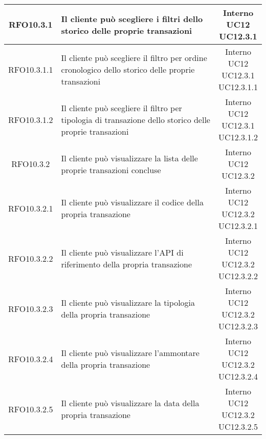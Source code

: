 \begin{longtable}{|c|p{8cm}|c|}
\hypertarget{RFO10.3.1}{RFO10.3.1} & Il cliente può scegliere i filtri dello storico delle proprie transazioni & \makecell*{Interno\\UC12\\UC12.3.1} \\
\hline

\hypertarget{RFO10.3.1.1}{RFO10.3.1.1} & Il cliente può scegliere il filtro per ordine cronologico dello storico delle proprie transazioni & \makecell*{Interno\\UC12\\UC12.3.1\\UC12.3.1.1} \\
\hline
\hypertarget{RFO10.3.1.2}{RFO10.3.1.2} & Il cliente può scegliere il filtro per tipologia di transazione dello storico delle proprie transazioni & \makecell*{Interno\\UC12\\UC12.3.1\\UC12.3.1.2} \\
\hline

\hypertarget{RFO10.3.2}{RFO10.3.2} & Il cliente può visualizzare la lista delle proprie transazioni concluse & \makecell*{Interno\\UC12\\UC12.3.2} \\
\hline

\hypertarget{RFO10.3.2.1}{RFO10.3.2.1} & Il cliente può visualizzare il codice della propria transazione & \makecell*{Interno\\UC12\\UC12.3.2\\UC12.3.2.1} \\
\hline
\hypertarget{RFO10.3.2.2}{RFO10.3.2.2} & Il cliente può visualizzare l'API di riferimento della propria transazione & \makecell*{Interno\\UC12\\UC12.3.2\\UC12.3.2.2} \\
\hline
\hypertarget{RFO10.3.2.3}{RFO10.3.2.3} & Il cliente può visualizzare la tipologia della propria transazione & \makecell*{Interno\\UC12\\UC12.3.2\\UC12.3.2.3} \\
\hline
\hypertarget{RFO10.3.2.4}{RFO10.3.2.4} & Il cliente può visualizzare l'ammontare della propria transazione & \makecell*{Interno\\UC12\\UC12.3.2\\UC12.3.2.4} \\
\hline
\hypertarget{RFO10.3.2.5}{RFO10.3.2.5} & Il cliente può visualizzare la data della propria transazione & \makecell*{Interno\\UC12\\UC12.3.2\\UC12.3.2.5} \\
\hline


\end{longtable}
